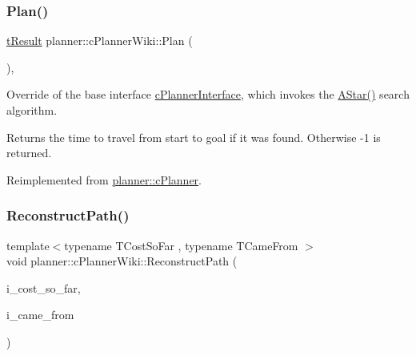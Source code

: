 \mbox{\label{classplanner_1_1c_planner_wiki_a9d18be721400b51162ff463ab11d1721}} 
\subsubsection{\texorpdfstring{Plan()}{Plan()}}
{\footnotesize\ttfamily \mbox{\hyperlink{structt_result}{t\+Result}} planner\+::c\+Planner\+Wiki\+::\+Plan (\begin{DoxyParamCaption}{ }\end{DoxyParamCaption})\hspace{0.3cm}{\ttfamily [override]}, {\ttfamily [virtual]}}



Override of the base interface \mbox{\hyperlink{classplanner_1_1c_planner_interface}{c\+Planner\+Interface}}, which invokes the \mbox{\hyperlink{classplanner_1_1c_planner_wiki_a2652cf0e84d0a1fcd17e6c4288179955}{A\+Star()}} search algorithm. 

\begin{DoxyReturn}{Returns}
the time to travel from start to goal if it was found. Otherwise -\/1 is returned. 
\end{DoxyReturn}


Reimplemented from \mbox{\hyperlink{classplanner_1_1c_planner_a21230c015260b9fc34ad2f239592470e}{planner\+::c\+Planner}}.

\mbox{\label{classplanner_1_1c_planner_wiki_a049e5c4a9540fecbe82a0648f771bbd2}} 
\subsubsection{\texorpdfstring{Reconstruct\+Path()}{ReconstructPath()}}
{\footnotesize\ttfamily template$<$typename T\+Cost\+So\+Far , typename T\+Came\+From $>$ \\
void planner\+::c\+Planner\+Wiki\+::\+Reconstruct\+Path (\begin{DoxyParamCaption}\item[{T\+Cost\+So\+Far \&\&}]{i\+\_\+cost\+\_\+so\+\_\+far,  }\item[{T\+Came\+From \&\&}]{i\+\_\+came\+\_\+from }\end{DoxyParamCaption})}



